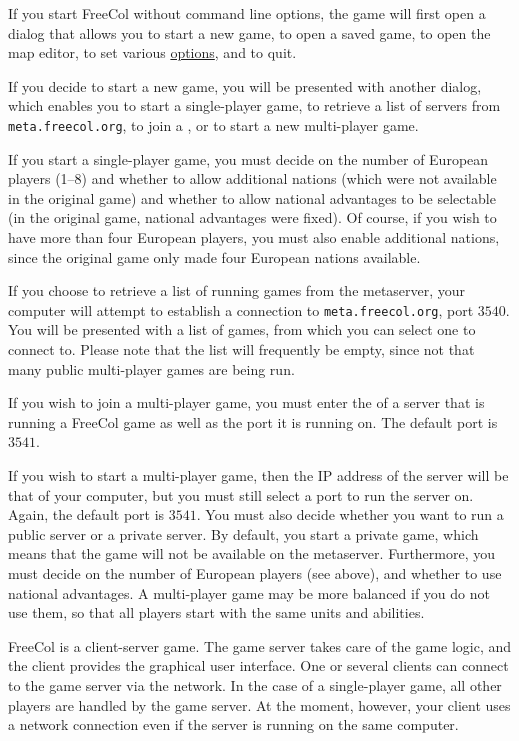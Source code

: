 \documentclass[12pt]{book}
\begin{document}
If you start FreeCol without command line options, the game will first
open a dialog that allows you to start a new game, to open a saved
game, to open the map editor, to set various \hyperlink{Client
  options}{options}, and to quit.

If you decide to start a new game, you will be presented with another
dialog, which enables you to start a single-player game, to retrieve a
list of servers from \verb$meta.freecol.org$,
to join a , or to start a new multi-player
game.

If you start a single-player game, you must decide on the number of
European players (1--8) and whether to allow additional nations (which
were not available in the original game) and whether to allow national
advantages to be selectable (in the original game, national advantages
were fixed). Of course, if you wish to have more than four European
players, you must also enable additional nations, since the original
game only made four European nations available.

If you choose to retrieve a list of running games from the metaserver,
your computer will attempt to establish a connection to
\verb$meta.freecol.org$, port $3540$. You will be
presented with a list of games, from which you can select one to
connect to. Please note that the list will frequently be empty, since
not that many public multi-player games are being run.

If you wish to join a multi-player game, you must enter the
 of a server that is running a FreeCol game as
well as the port it is running on. The default port is
$3541$.

If you wish to start a multi-player game, then the IP address of the
server will be that of your computer, but you must still select a port
to run the server on. Again, the default port is $3541$. You must also
decide whether you want to run a public server or a private server. By
default, you start a private game, which means that the game will not
be available on the metaserver. Furthermore, you must decide on the
number of European players (see above), and whether to use national
advantages. A multi-player game may be more balanced if you do not use
them, so that all players start with the same units and abilities.

FreeCol is a client-server game. The game server takes care of the
game logic, and the client provides the graphical user interface. One
or several clients can connect to the game server via the network. In
the case of a single-player game, all other players are handled by the
game server. At the moment, however, your client uses a network
connection even if the server is running on the same computer.
\end{document}
